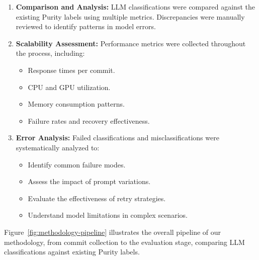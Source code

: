 \begin{enumerate}
    \item \textbf{Comparison and Analysis:} LLM classifications were compared against the existing Purity labels using multiple metrics. Discrepancies were manually reviewed to identify patterns in model errors.
    
    \item \textbf{Scalability Assessment:} Performance metrics were collected throughout the process, including:
    \begin{itemize}
        \item Response times per commit.
        \item CPU and GPU utilization.
        \item Memory consumption patterns.
        \item Failure rates and recovery effectiveness.
    \end{itemize}
    
    \item \textbf{Error Analysis:} Failed classifications and misclassifications were systematically analyzed to:
    \begin{itemize}
        \item Identify common failure modes.
        \item Assess the impact of prompt variations.
        \item Evaluate the effectiveness of retry strategies.
        \item Understand model limitations in complex scenarios.
    \end{itemize}
\end{enumerate}

Figure~\ref{fig:methodology-pipeline} illustrates the overall pipeline of our methodology, from commit collection to the evaluation stage, comparing LLM classifications against existing Purity labels.

